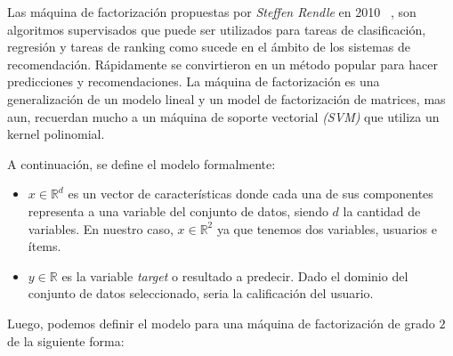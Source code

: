 \documentclass[11pt,a4paper,twoside]{thesis}
\begin{document}
Las máquina de factorización propuestas por \textit{Steffen Rendle} en 2010
~\cite{fm}, son algoritmos supervisados que puede ser utilizados para tareas de
clasificación, regresión y tareas de ranking como sucede en el ámbito de los
sistemas de recomendación. Rápidamente se convirtieron en un método popular
para hacer predicciones y recomendaciones. La máquina de factorización es una
generalización de un modelo lineal y un model de factorización de matrices, mas
aun, recuerdan mucho a un máquina de soporte vectorial \textit{(SVM)} que
utiliza un kernel polinomial.

A continuación, se define el modelo formalmente:

\begin{itemize}
	\item $x\in\mathbb{R}^{d}$ es un vector de características donde cada una de sus
	      componentes representa a una variable del conjunto de datos, siendo $d$
	      la cantidad de variables. En nuestro caso,
	      $x\in\mathbb{R}^{2}$ ya que tenemos dos variables, usuarios e ítems.
	\item $y\in\mathbb{R}$ es la variable \textit{target} o resultado a predecir.
	      Dado el dominio del conjunto de datos seleccionado, seria la
	      calificación del usuario.
\end{itemize}

Luego, podemos definir el modelo para una máquina de factorización de grado $2$
de la siguiente forma:
\end{document}
